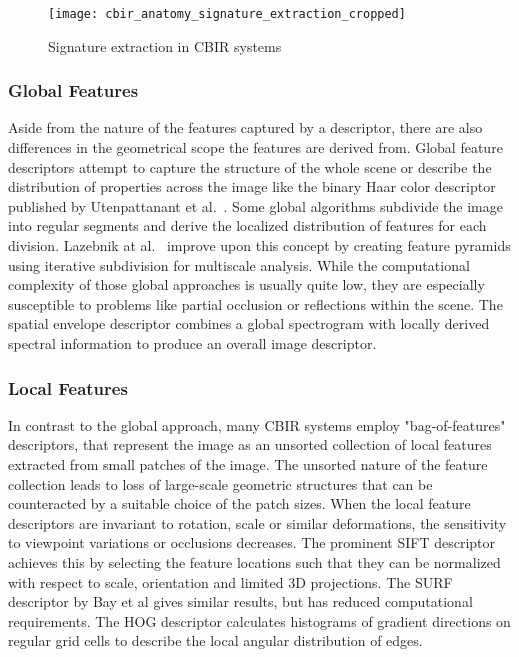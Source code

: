 \begin{figure}[h]
    \centering
        \texttt{[image: cbir\_anatomy\_signature\_extraction\_cropped]}
    \caption{Signature extraction in CBIR systems}
    \label{fig:cbir_signature_extraction}
\end{figure}

\subsubsection{Global Features}

Aside from the nature of the features captured by a descriptor, there are also
differences in the geometrical scope the features are derived from. Global
feature descriptors attempt to capture the structure of the whole scene or
describe the distribution of properties across the image like the binary Haar
color descriptor published by Utenpattanant et al.\
\autocite{utenpattanant_color_2006}. Some global algorithms subdivide the image
into regular segments and derive the localized distribution of features for
each division. Lazebnik at al.\ \autocite{lazebnik_beyond_2006}
\autocite{lazebnik_spatial_2009} improve upon this concept by creating feature
pyramids using iterative subdivision for multiscale analysis. While the
computational complexity of those global approaches is usually quite low, they
are especially susceptible to problems like partial occlusion or reflections
within the scene. The spatial envelope descriptor
\autocite{oliva_modeling_2001} combines a global spectrogram with locally
derived spectral information to produce an overall image descriptor.

\subsubsection{Local Features}

In contrast to the global approach, many CBIR systems employ "bag-of-features"
descriptors, that represent the image as an unsorted collection of local
features extracted from small patches of the image. The unsorted nature of the
feature collection leads to loss of large-scale geometric structures that can
be counteracted by a suitable choice of the patch sizes. When the local feature
descriptors are invariant to rotation, scale or similar deformations, the
sensitivity to viewpoint variations or occlusions decreases. The prominent SIFT
descriptor \autocite{lowe_object_1999} achieves this by selecting the feature
locations such that they can be normalized with respect to scale, orientation
and limited 3D projections. The SURF descriptor by Bay et al
\autocite{bay_speeded-up_2008} gives similar results, but has reduced
computational requirements. The HOG descriptor \autocite{dalal_histograms_2005}
calculates histograms of gradient directions on regular grid cells to describe
the local angular distribution of edges.

